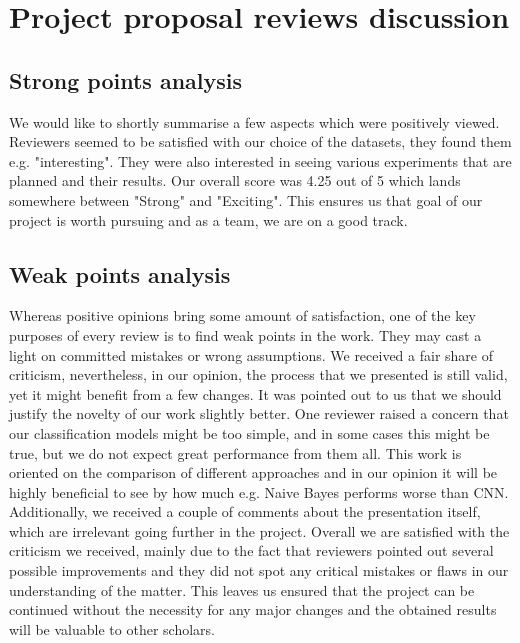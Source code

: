 \section{Project proposal reviews discussion}

\subsection{Strong points analysis}
We would like to shortly summarise a few aspects which were positively viewed. Reviewers seemed to be satisfied with our choice of the datasets, they found them e.g. "interesting". They were also interested in seeing various experiments  that are planned and their results. Our overall score was 4.25 out of 5 which lands somewhere between "Strong" and "Exciting". This ensures us that goal of our project is worth pursuing and as a team, we are on a good track. 

\subsection{Weak points analysis}
Whereas positive opinions bring some amount of satisfaction, one of the key purposes of every review is to find weak points in the work. They may cast a light on committed mistakes or wrong assumptions. We received a fair share of criticism, nevertheless, in our opinion, the process that we presented is still valid, yet it might benefit from a few changes. It was pointed out to us that we should justify the novelty of our work slightly better. One reviewer raised a concern that our classification models might be too simple, and in some cases this might be true, but we do not expect great performance from them all. This work is oriented on the comparison of different approaches and in our opinion it will be highly beneficial to see by how much e.g. Naive Bayes performs worse than CNN. Additionally, we received a couple of comments about the presentation itself, which are irrelevant going further in the project. Overall we are satisfied with the criticism we received, mainly due to the fact that reviewers pointed out several possible improvements and they did not spot any critical mistakes or flaws in our understanding of the matter. This leaves us ensured that the project can be continued without the necessity for any major changes and the obtained results will be valuable to other scholars.  